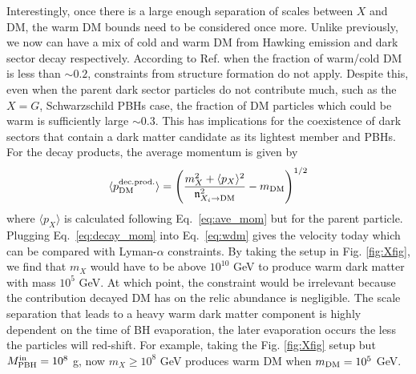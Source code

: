 \documentclass[aps,prd,reprint,twocolumn,preprintnumbers,floatfix,nofootinbib]{revtex4-1}
\begin{document}
Interestingly, once there is a large enough separation of scales between $X$ and DM, the warm DM bounds need to be considered once more. Unlike previously, we now can have a mix of cold and warm DM from Hawking emission and dark sector decay respectively. According to Ref. \cite{Baur:2017stq, Auffinger:2020afu} when the fraction of warm/cold DM is less than $\sim 0.2$, constraints from structure formation do not apply. Despite this, even when the parent dark sector particles do not contribute much, such as the $X=G$, Schwarzschild PBHs case, the fraction of DM particles which could be warm is sufficiently large $\sim 0.3$. This has implications for the coexistence of dark sectors that contain a dark matter candidate as its lightest member and PBHs. For the decay products, the average momentum is given by
\begin{align}\label{eq:decay_mom}
    \langle p_{\rm DM}^{\rm dec.prod.}\rangle = \left(\frac{m_X^2 + \langle p_X \rangle^2}{\mathfrak{n}_{X_i\to\rm DM}^2} -m_{\rm DM}\right)^{1/2}
\end{align}
where $\langle p_X \rangle$ is calculated following Eq.~\eqref{eq:ave_mom} but for the parent particle. Plugging Eq.~\eqref{eq:decay_mom} into Eq.~\eqref{eq:wdm} gives the velocity today which can be compared with Lyman-$\alpha$ constraints\cite{Baur:2017stq, Baldes:2020nuv}. By taking the setup in Fig. \ref{fig:Xfig}, we find that $m_X$ would have to be above $10^{10}$ GeV to produce warm dark matter with mass $10^5$ GeV. At which point, the constraint would be irrelevant because the contribution decayed DM has on the relic abundance is negligible. The scale separation that leads to a heavy warm dark matter component is highly dependent on the time of BH evaporation, the later evaporation occurs the less the particles will red-shift. For example, taking  the Fig. \ref{fig:Xfig} setup but $M_{\rm PBH}^{\rm in}=10^8$ g, now $m_{X}\geq 10^8$ GeV produces warm DM when $m_{\rm{DM}}=10^5$ GeV.
\end{document}
